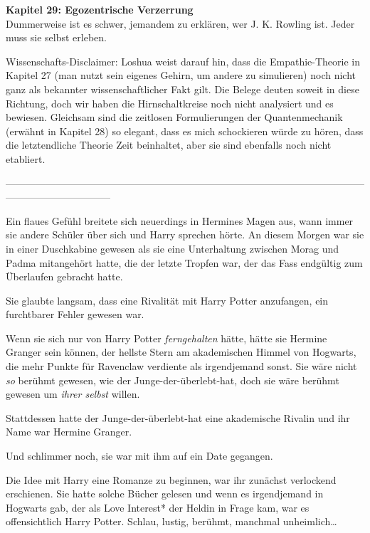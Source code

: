 

\hypertarget{egozentrische-verzerrung}{%

\textbf{Kapitel 29: Egozentrische Verzerrung}\\

Dummerweise ist es schwer, jemandem zu erklären, wer J. K. Rowling ist. Jeder muss sie selbst erleben.

Wissenschafts-Disclaimer: Loshua weist darauf hin, dass die Empathie-Theorie in Kapitel 27 (man nutzt sein eigenes Gehirn, um andere zu simulieren) noch nicht ganz als bekannter wissenschaftlicher Fakt gilt. Die Belege deuten soweit in diese Richtung, doch wir haben die Hirnschaltkreise noch nicht analysiert und es bewiesen. Gleichsam sind die zeitlosen Formulierungen der Quantenmechanik (erwähnt in Kapitel 28) so elegant, dass es mich schockieren würde zu hören, dass die letztendliche Theorie Zeit beinhaltet, aber sie sind ebenfalls noch nicht etabliert.

--------------------------------------------------------------------------------------------------------------------------------------------

Ein flaues Gefühl breitete sich neuerdings in Hermines Magen aus, wann immer sie andere Schüler über sich und Harry sprechen hörte. An diesem Morgen war sie in einer Duschkabine gewesen als sie eine Unterhaltung zwischen Morag und Padma mitangehört hatte, die der letzte Tropfen war, der das Fass endgültig zum Überlaufen gebracht hatte.

Sie glaubte langsam, dass eine Rivalität mit Harry Potter anzufangen, ein furchtbarer Fehler gewesen war.

Wenn sie sich nur von Harry Potter \emph{ferngehalten} hätte, hätte sie Hermine Granger sein können, der hellste Stern am akademischen Himmel von Hogwarts, die mehr Punkte für Ravenclaw verdiente als irgendjemand sonst. Sie wäre nicht \emph{so} berühmt gewesen, wie der Junge-der-überlebt-hat, doch sie wäre berühmt gewesen um \emph{ihrer selbst} willen.

Stattdessen hatte der Junge-der-überlebt-hat eine akademische Rivalin und ihr Name war Hermine Granger.

Und schlimmer noch, sie war mit ihm auf ein Date gegangen.

Die Idee mit Harry eine Romanze zu beginnen, war ihr zunächst verlockend erschienen. Sie hatte solche Bücher gelesen und wenn es irgendjemand in Hogwarts gab, der als Love Interest* der Heldin in Frage kam, war es offensichtlich Harry Potter. Schlau, lustig, berühmt, manchmal unheimlich…

}
